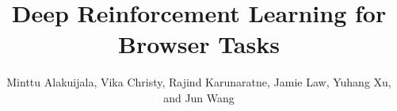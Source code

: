 \documentclass[10pt,journal,compsoc]{IEEEtran}
\begin{document}
%
\title{Deep Reinforcement Learning for Browser Tasks}
%
%
%
%

\author{Minttu Alakuijala, Vika Christy, Rajind Karunaratne, Jamie Law, Yuhang Xu, and Jun Wang}
\end{document}
